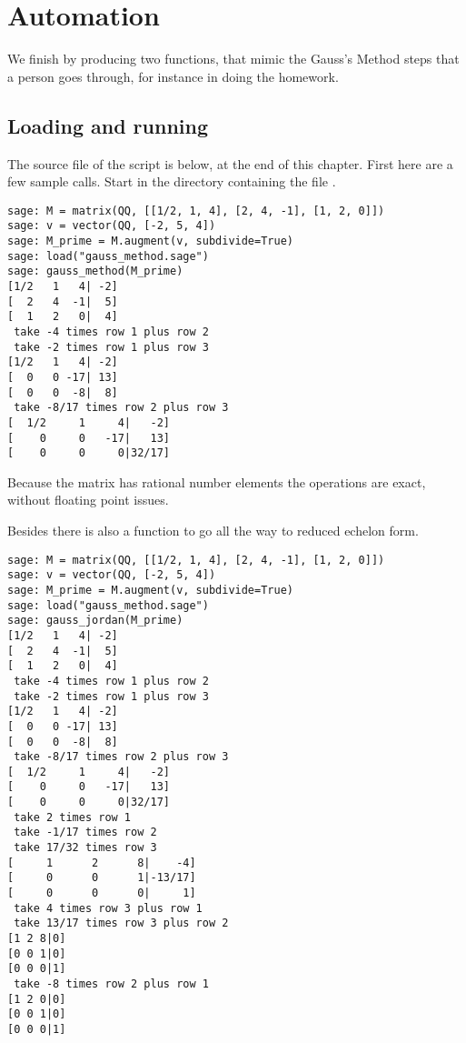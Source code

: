 \section{Automation}

We finish by producing two functions, 
that mimic the Gauss's Method steps that a person goes through, for instance in 
doing the homework.


\subsection{Loading and running}
The source file of the script is below, at the end of this chapter. 
First here are a few sample calls.
Start \Sage{} in the directory containing the file .
\begin{lstlisting}
sage: M = matrix(QQ, [[1/2, 1, 4], [2, 4, -1], [1, 2, 0]])
sage: v = vector(QQ, [-2, 5, 4])
sage: M_prime = M.augment(v, subdivide=True)
sage: load("gauss_method.sage")
sage: gauss_method(M_prime)
[1/2   1   4| -2]
[  2   4  -1|  5]
[  1   2   0|  4]
 take -4 times row 1 plus row 2
 take -2 times row 1 plus row 3
[1/2   1   4| -2]
[  0   0 -17| 13]
[  0   0  -8|  8]
 take -8/17 times row 2 plus row 3
[  1/2     1     4|   -2]
[    0     0   -17|   13]
[    0     0     0|32/17]
\end{lstlisting}
Because the matrix has rational number elements the operations are 
exact, without floating point issues.

Besides  there is also a 
 function
to go all the way to reduced echelon form.
\begin{lstlisting}
sage: M = matrix(QQ, [[1/2, 1, 4], [2, 4, -1], [1, 2, 0]])
sage: v = vector(QQ, [-2, 5, 4])
sage: M_prime = M.augment(v, subdivide=True)
sage: load("gauss_method.sage")
sage: gauss_jordan(M_prime)
[1/2   1   4| -2]
[  2   4  -1|  5]
[  1   2   0|  4]
 take -4 times row 1 plus row 2
 take -2 times row 1 plus row 3
[1/2   1   4| -2]
[  0   0 -17| 13]
[  0   0  -8|  8]
 take -8/17 times row 2 plus row 3
[  1/2     1     4|   -2]
[    0     0   -17|   13]
[    0     0     0|32/17]
 take 2 times row 1
 take -1/17 times row 2
 take 17/32 times row 3
[     1      2      8|    -4]
[     0      0      1|-13/17]
[     0      0      0|     1]
 take 4 times row 3 plus row 1
 take 13/17 times row 3 plus row 2
[1 2 8|0]
[0 0 1|0]
[0 0 0|1]
 take -8 times row 2 plus row 1
[1 2 0|0]
[0 0 1|0]
[0 0 0|1]
\end{lstlisting}



